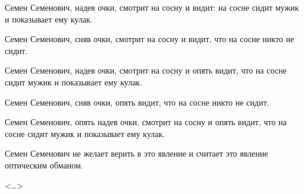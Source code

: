 Семен  Семенович, надев очки, смотрит на сосну и видит: на сосне сидит мужик и  показывает ему кулак.

Семен Семенович,  сняв очки,  смотрит на сосну и видит, что на сосне никто не сидит.

Семен Семенович, надев очки,  смотрит на сосну и опять видит,  что на сосне сидит мужик и показывает ему кулак.

Семен Семенович, сняв очки, опять видит, что на сосне никто не сидит.

Семен Семенович, опять надев очки, смотрит на сосну и опять видит, что на сосне сидит мужик и показывает ему кулак.

Семен Семенович не  желает верить  в это явление и считает это явление оптическим обманом.
\begin{flushright} <\dots> \end{flushright}
